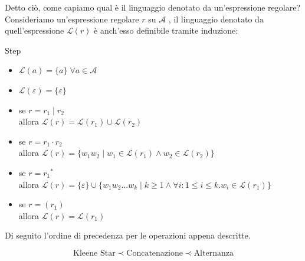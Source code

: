 \documentclass[class=book, crop=false, oneside, 12pt]{standalone}
\begin{document}
Detto ciò, come capiamo qual è il linguaggio denotato da un’espressione regolare?
Consideriamo un’espressione regolare \(r\) su \(\mathcal{A}\) , il linguaggio denotato da quell'espressione \(\mathcal{L}(r)\) è anch'esso definibile tramite induzione:
\begin{labeling}{Step}
    \item[Base] \begin{itemize}
                    \item \(\mathcal{L}(a) = \{a\} \; \forall a \in \mathcal{A}\)
                    \item \(\mathcal{L}(\varepsilon) = \{\varepsilon\}\)
                \end{itemize}
    \item[Step] \begin{itemize}
                    \item se \(r = r_1 \mid r_2 \) \\
                    allora \(\mathcal{L}(r)= \mathcal{L}(r_1) \cup \mathcal{L}(r_2)\)
                    \item se \(r=r_1 \cdot r_2\) \\
                    allora \(\mathcal{L}(r) = \{w_1 w_2 \mid w_1 \in \mathcal{L}(r_1) \land w_2 \in \mathcal{L}(r_2)\}\)
                    \item se \(r = r_1\)\(^\ast\) \\
                    allora \( \mathcal{L}(r) = \{ \varepsilon \} \cup \{ w_1 w_2 ... w_k \mid k \ge 1 \land \forall i : 1 \le i \le k.w_i \in \mathcal{L}(r_1)\} \)
                    \item se \(r=(r_1)\) \\allora \( \mathcal{L}(r) = \mathcal{L}(r_1)\)
                \end{itemize}
\end{labeling}

\noindent Di seguito l'ordine di precedenza per le operazioni appena descritte.

\begin{equation*}
    \textrm{Kleene Star} \prec \textrm{Concatenazione} \prec \textrm{Alternanza}
\end{equation*}

\end{document}
